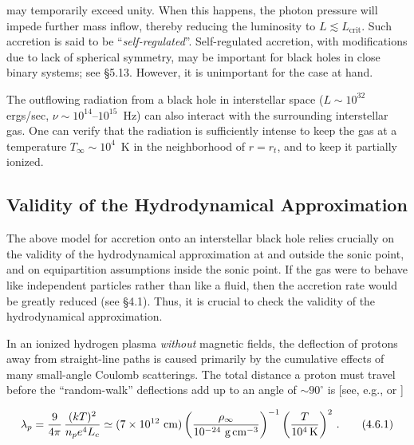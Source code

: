 \documentclass[aps,prd,twocolumn,superscriptaddress,nofootinbib]{revtex4-2}
\begin{document}
may temporarily exceed unity.  When this happens, the photon pressure will
impede further mass inflow, thereby reducing the luminosity to $L \lesssim L_{\text{crit}}$.  Such
accretion is said to be ``\emph{self-regulated}''.  Self-regulated accretion, with modifications due to lack of spherical symmetry, may be important for black holes in
close binary systems; see \S5.13.  However, it is unimportant for the case at
hand.

The outflowing radiation from a black hole in interstellar space ($L \sim 10^{32}$
ergs/sec, $\nu \sim 10^{14}$--$10^{15}$~Hz) can also interact with the surrounding interstellar
gas.  One can verify that the radiation is sufficiently intense to keep the gas at a
temperature $T_\infty \sim 10^4$~K in the neighborhood of $r = r_t$, and to keep it partially
ionized.


\subsection{Validity of the Hydrodynamical Approximation}
\label{sec:4.6}

The above model for accretion onto an interstellar black hole relies crucially on
the validity of the hydrodynamical approximation at and outside the sonic point,
and on equipartition assumptions inside the sonic point.  If the gas were to behave
like independent particles rather than like a fluid, then the accretion rate would
be greatly reduced (see \S4.1).  Thus, it is crucial to check the validity of the
hydrodynamical approximation.

In an ionized hydrogen plasma \emph{without} magnetic fields, the deflection of
protons away from straight-line paths is caused primarily by the cumulative
effects of many small-angle Coulomb scatterings.  The total distance a proton
must travel before the ``random-walk'' deflections add up to an angle of ${\sim}90^\circ$
is [see, e.g., \cite{Shkarofsky1966} or \cite{Pikelner1961}]

\begin{equation}
\lambda_p = \frac{9}{4\pi}\,\frac{(kT)^2}{n_p e^4 L_c}
\simeq (7 \times 10^{12}~\text{cm})\left(\frac{\rho_\infty}{10^{-24}~\text{g\,cm}^{-3}}\right)^{-1}
\left(\frac{T}{10^4\,\text{K}}\right)^{2}\,.
\tag{4.6.1}
\end{equation}
\end{document}

